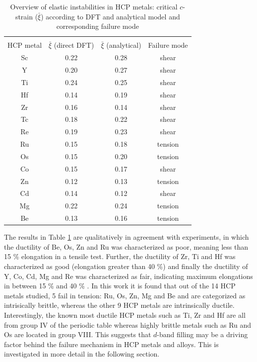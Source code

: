 \documentclass[showpacs,aps,floatfix,prb,reprint,superscriptaddress]{revtex4-1}
\begin{document}
\begin{table}[h!]
\caption{Overview of elastic instabilities in HCP metals: critical $c$-strain ($\bar{\xi}$) according to DFT and analytical model and corresponding failure mode}
 \label{tab:overview_elastic1}
  \begin{tabular}{c c c c}
    \hline 		\\ [-2.2ex]
    HCP metal & $\bar{\xi}$ (direct DFT) & $\bar{\xi}$ (analytical) & Failure mode   \\
    \hline
    Sc & 0.22 & 0.28 & shear \\
    Y & 0.20 & 0.27 & shear  \\
		Ti & 0.24 & 0.25 & shear \\
		Hf & 0.14 & 0.19 & shear \\
		Zr & 0.16 & 0.14 & shear \\
		Tc & 0.18 & 0.22 & shear \\
		Re & 0.19 & 0.23 & shear \\
		Ru & 0.15 & 0.18 & tension \\
		Os & 0.15 & 0.20 & tension \\
		Co & 0.15 & 0.17 & shear \\
		Zn & 0.12 & 0.13 & tension \\	
		Cd & 0.14 & 0.12 & shear \\
		Mg & 0.22 & 0.24 & tension \\
		Be & 0.13 & 0.16 & tension \\
    \hline
  \end{tabular}  
\end{table}

The results in Table \ref{tab:overview_elastic1} are qualitatively in agreement with experiments, in which the ductility of Be, Os, Zn and Ru was characterized as poor, meaning less than 15 \% elongation in a tensile test. Further, the ductility of Zr, Ti and Hf was characterized as good (elongation greater than 40 \%) and finally the ductility of Y, Co, Cd, Mg and Re was characterized as fair, indicating maximum elongations in between 15 \% and 40 \% \cite{yoo1981slip}. In this work it is found that out of the 14 HCP metals studied, 5 fail in tension: Ru, Os, Zn, Mg and Be and are categorized as intrisically brittle, whereas the other 9 HCP metals are intrinsically ductile. Interestingly, the known most ductile HCP metals such as Ti, Zr and Hf are all from group IV of the periodic table whereas highly brittle metals such as Ru and Os are located in group VIII. This suggests that $d$-band filling may be a driving factor behind the failure mechanism in HCP metals and alloys. This is investigated in more detail in the following section.
\end{document}

